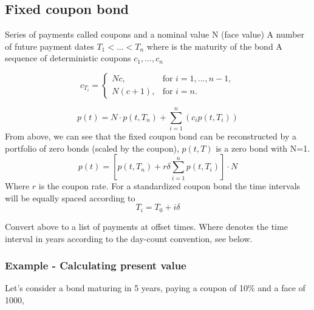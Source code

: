 \documentclass[11pt,a4paper]{article}
\numberwithin{equation}{section}
\begin{document}
\subsection{Fixed coupon bond}
Series of payments called coupons and a nominal value N (face value)
A number of future payment dates $T_1 < ... < T_n$ where is the maturity of the bond
A sequence of deterministic coupons $c_1, ..., c_n$

\[ c_{T_i} = \left\{
\begin{array}{ll}
  Nc, & \text{for } i=1,...,n-1,  \\
  N(c+1), &\text{for } i=n.
\end{array} \right.\]

\[
p(t) = N \cdot p(t,T_n)+\sum_{i=1}^{n} (c_ip(t,T_i))
\]
From above, we can see that the fixed coupon bond can be reconstructed by a portfolio of zero
bonds (scaled by the coupon), $p(t,T)$ is a zero bond with N=1.
\[
p(t)=\left[p(t,T_n)+r\delta\sum_{i=1}^{n} p(t,T_i)\right]\cdot N
\]
Where $r$ is the coupon rate. For a standardized coupon bond the time intervals will be equally
spaced according to
\[
T_i=T_0+i\delta
\]

Convert above to a list of payments at offset times. Where denotes the time interval in years
according to the day-count convention, see below.

\subsubsection{Example - Calculating present value}


Let's consider a bond maturing in 5 years, paying a coupon of 10\% and a face of 1000,
\end{document}
